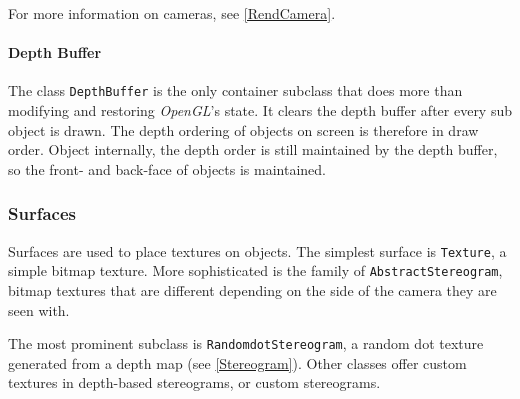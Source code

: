 For more information on cameras, see \ref{RendCamera}.

\paragraph{Depth Buffer}
The class \lstinline{DepthBuffer} is the only container subclass that does more than modifying and restoring \textit{OpenGL}'s state.
It clears the depth buffer after every sub object is drawn.
The depth ordering of objects on screen is therefore in draw order.
Object internally, the depth order is still maintained by the depth buffer, so the front- and back-face of objects is maintained.


\subsubsection{Surfaces}
Surfaces are used to place textures on objects.
The simplest surface is \lstinline{Texture}, a simple bitmap texture.
More sophisticated is the family of \lstinline{AbstractStereogram}, bitmap textures that are different depending on the side of the camera they are seen with.

The most prominent subclass is \lstinline{RandomdotStereogram}, a random dot texture generated from a depth map (see \ref{Stereogram}).
Other classes offer custom textures in depth-based stereograms, or custom stereograms.

